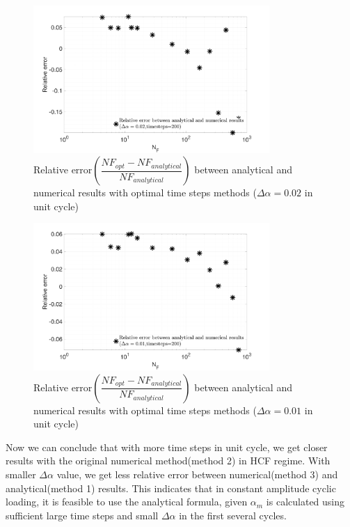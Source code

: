 \begin{figure}[!h]
	\centering
	\includegraphics[width=0.8\textwidth]{figures//SN_opt_ana_200_delta_alp=0.02_err.png} 
	\caption{Relative error$\left( \dfrac{NF_{opt}-NF_{analytical}}{NF_{analytical}}\right)$  between analytical and numerical results with optimal time steps methods ($\Delta \alpha=0.02$ in unit cycle)}	
	\label{fig.errorNumAna0.02}
\end{figure}
\begin{figure}[!h]
	\centering
	\includegraphics[width=0.8\textwidth]{figures//SN_opt_ana_200_delta_alp=0.01_err.png} 
	\caption{Relative error$\left(\dfrac{NF_{opt}-NF_{analytical}}{NF_{analytical}}\right)$  between analytical and numerical results with optimal time steps methods ($\Delta \alpha=0.01$ in unit cycle)}
	\label{fig.errorNumAna0.01}
\end{figure}

Now we can conclude that with more time steps in unit cycle, we get closer results with the original numerical method(method 2) in HCF regime. With smaller $\Delta \alpha$ value, we get less relative error between numerical(method 3) and analytical(method 1) results. This indicates that in constant amplitude cyclic loading, it is feasible to use the analytical formula, given $\alpha_m$ is calculated using sufficient large time steps and small $\Delta \alpha$ in the first several cycles.

